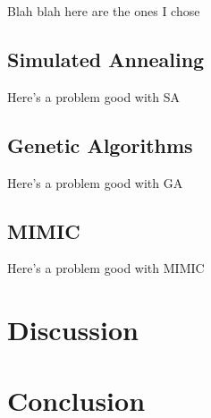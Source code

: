 \documentclass{article}
\begin{document}
  Blah blah here are the ones I chose

  \subsection{Simulated Annealing}
  Here's a problem good with SA

  \subsection{Genetic Algorithms}
  Here's a problem good with GA

  \subsection{MIMIC}
  Here's a problem good with MIMIC

  \section{Discussion}

  \section{Conclusion}
\end{document}
